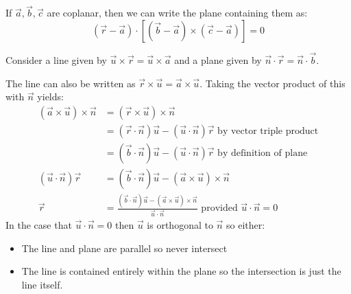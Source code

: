 \documentclass[../main.tex]{subfiles}
\begin{document}
If $\vec{a}, \vec{b}, \vec{c}$ are coplanar, then we can write the plane containing them as:
\[
  (\vec{r} - \vec{a}) \cdot [(\vec{b} - \vec{a}) \times (\vec{c} - \vec{a})] = 0
\]
\begin{example}
  Consider a line given by $\vec{u} \times \vec{r} = \vec{u} \times \vec{a}$ and a plane given by $\vec{n} \cdot \vec{r} = \vec{n} \cdot \vec{b}$.

  The line can also be written as $\vec{r} \times \vec{u} = \vec{a} \times \vec{u}$.
  Taking the vector product of this with $\vec{n}$ yields:
  \begin{align*}
    (\vec{a} \times \vec{u}) \times \vec{n} &= (\vec{r} \times \vec{u}) \times \vec{n}\\
                                            &= (\vec{r} \cdot \vec{n}) \vec{u} - (\vec{u} \cdot \vec{n}) \vec{r} \text{ by vector triple product}\\
                                            &= (\vec{b} \cdot \vec{n}) \vec{u} - (\vec{u} \cdot \vec{n}) \vec{r} \text{ by definition of plane}\\
    (\vec{u} \cdot \vec{n})\vec{r} &= (\vec{b} \cdot \vec{n}) \vec{u} - (\vec{a} \times \vec{u}) \times \vec{n}\\
    \vec{r} &= \frac{(\vec{b} \cdot\vec{n})\vec{u} - (\vec{a} \times \vec{u})\times\vec{n}}{\vec{u} \cdot\vec{n}} \text{ provided $\vec{u} \cdot \vec{n} = 0$}
  \end{align*}
  In the case that $\vec{u} \cdot \vec{n} = 0$ then $\vec{u}$ is orthogonal to $\vec{n}$ so either:
  \begin{itemize}
    \item The line and plane are parallel so never intersect
    \item The line is contained entirely within the plane so the intersection is just the line itself.
  \end{itemize}
\end{example}
\end{document}
